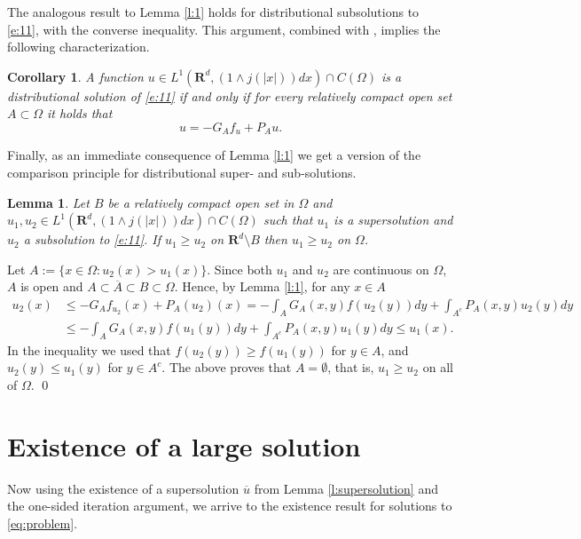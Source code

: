 \documentclass[a4paper,12pt,draft]{article}
\theoremstyle{plain}
\newtheorem{corollary}[thm]{Corollary}
\newtheorem{lemma}[thm]{Lemma}
\theoremstyle{definition}
\numberwithin{equation}{section}
\newcommand\R{\mathbf{R}}
\renewcommand{\le}{\leqslant}
\renewcommand{\ge}{\geqslant}
\newcommand{\1}{1}
\begin{document}
The analogous result to Lemma \ref{l:1} holds for distributional subsolutions to \eqref{e:11}, with the converse inequality. This argument, combined with \cite[Lemma 3.1]{GKL}, implies the following characterization.

\begin{corollary}
    A function $u\in  L^1(\R^d, (1\wedge j(|x|))dx)\cap C(\Omega)$ is a distributional solution of \eqref{e:11}  if and only if for every relatively compact open set $A\subset \Omega$ it holds that 
\begin{equation}\label{e:3}
u = -G_A f_u+P_A u.
\end{equation}
\end{corollary}
Finally, as an immediate consequence of Lemma \ref{l:1} we get a version of the comparison principle for distributional super- and sub-solutions.

\begin{lemma}\label{lem:comparison}
  Let $B$ be a relatively compact open set in $\Omega$ and $u_1, u_2\in  L^1(\R^d, (1\wedge j(|x|))dx)\cap C(\Omega)$ such that $u_1$ is a supersolution and $u_2$ a subsolution to \eqref{e:11}. If $u_1\ge u_2$ on $\R^d\setminus B$ then $u_1\ge u_2$ on $\Omega$. 
 \end{lemma}
 \proof  
Let $A:=\{x\in\Omega:u_2(x)>u_1(x)\}$. Since both $u_1$ and $u_2$ are continuous on $\Omega$, $A$ is open and $A\subset\overline{A}\subset  B\subset \Omega$. Hence, by Lemma \ref{l:1}, for any $x\in A$
\begin{align}
u_2(x)& \le -G_A f_{u_2}(x)+ P_A(u_2 )(x) =-\int_A G_A(x,y)f(u_2(y))dy +\int_{A^c}P_A(x,y)u_2(y) dy \nonumber\\
&\le -\int_A G_A(x,y)f(u_1(y))dy +\int_{A^c}P_A(x,y)u_1(y) dy\le u_1(x).\label{e:max}
\end{align}
In the inequality we used that $f(u_2(y))\ge f(u_1(y))$ for $y\in A$, and $u_2(y)\le u_1(y)$ for $y\in A^c$. The above proves that $A=\emptyset$, that is, $u_1\ge u_2$ on all of $\Omega$.
\qed

\section{Existence of a large solution }

Now using the existence of a supersolution $\overline{u}$ from Lemma \ref{l:supersolution} and the one-sided iteration argument, we arrive to the existence result for solutions to \eqref{eq:problem}.
\end{document}

